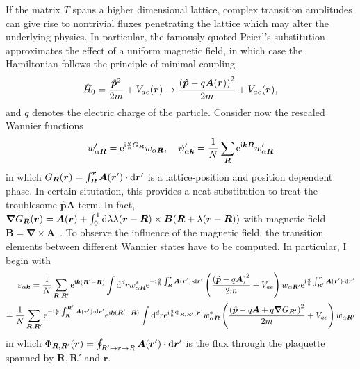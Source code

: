If the matrix $T$ spans a higher dimensional lattice, complex transition amplitudes can give rise to nontrivial fluxes penetrating the lattice which may alter the underlying physics.
In particular, the famously quoted Peierl's substitution approximates the effect of a uniform magnetic field, in which case the Hamiltonian follows the principle of minimal coupling
\begin{align}
    \hat H_0 = \frac{\hat{\bm p}^2}{2m}+V_{ae}(\bm r)\rightarrow \frac{\left( \hat{\bm p} - q\bm A(\bm r) \right)^2}{2m}+V_{ae}(\bm r),
\end{align}
and $q$ denotes the electric charge of the particle.
Consider now the rescaled Wannier functions
\begin{align}
    w'_{\alpha\bm R} = \mathrm e^{\mathrm i\frac q\hbar G_{\bm R}}w_{\alpha\bm R},
    \quad
    \psi'_{\alpha\bm k} = \frac1N\sum_{\bm R}\mathrm e^{\mathrm i\bm k\bm R}w'_{\alpha\bm R}
\end{align}
in which $G_{\bm R}(\bm r) = \int_{\bm R}^{\bm r}\bm A(\bm r')\cdot\mathrm d \bm r'$ is a lattice-position and position dependent phase.
In certain situtation, this provides a neat substitution to treat the troublesome $\hat{\bm p}\bm A$ term.
In fact, $\bm\nabla G_{\bm R}(\bm r) = \bm A(\bm r) + \int_0^1\mathrm d\lambda\lambda (\bm r-\bm R)\times\bm B(\bm R+\lambda(\bm r-\bm R))$ with magnetic field $\bm B=\bm\nabla\times\bm A$~\cite{Luttinger1951}.
To observe the influence of the magnetic field, the transition elements between different Wannier states have to be computed.
In particular, I begin with
\begin{align}
    \varepsilon_{\alpha\bm k}
    =
    \frac1N\sum_{\bm R,\bm R'}\mathrm e^{\mathrm i\bm k(\bm R'-\bm R)}
    \int\mathrm d^d r
        w_{\alpha\bm R}^*
        \mathrm e^{-\mathrm i\frac q\hbar\int_{\bm R}^{\bm r}\bm A(\bm r')\cdot\mathrm d \bm r'}
        \left( \frac{\left( \hat{\bm p}-q\bm A \right)^2}{2m}+V_{ae} \right)
        w_{\alpha \bm R'}
        \mathrm e^{\mathrm i\frac q\hbar\int_{\bm R'}^{\bm r}\bm A(\bm r')\cdot\mathrm d \bm r'}
    \\
    =
    \frac1N\sum_{\bm R,\bm R'}\mathrm e^{-\mathrm i\frac q\hbar\int_{\bm R}^{\bm R'}\bm A(\bm r')\cdot\mathrm d \bm r'}\mathrm e^{\mathrm i\bm k(\bm R'-\bm R)}
    \int\mathrm d^d r
        \mathrm e^{\mathrm i\frac q\hbar\Phi_{\bm R,\bm R'}(\bm r)}
        w_{\alpha\bm R}^*
        \left( \frac{\left( \hat{\bm p}-q\bm A+q\bm\nabla G_{\bm R'} \right)^2}{2m}+V_{ae} \right)
        w_{\alpha \bm R'}
\end{align}
in which $\Phi_{\bm R,\bm R'}(\bm r) = \oint_{R'\rightarrow r\rightarrow R}\bm A(\bm r')\cdot\mathrm d \bm r'$ is the flux through the plaquette spanned by $\bm R, \bm R'$ and $\bm r$.
